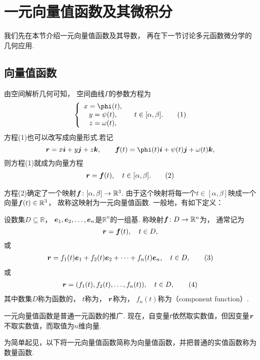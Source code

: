 \section{一元向量值函数及其微积分}
我们先在本节介绍一元向量值函数及其导数，
再在下一节讨论多元函数微分学的几何应用.

\subsection{向量值函数}
由空间解析几何可知，
空间曲线\(\Gamma\)的参数方程为\begin{gather}
	\left\{ \begin{array}{c}
		x=\phi(t), \\
		y=\psi(t), \\
		z=\omega(t),
	\end{array} \right. \quad
	t \in [\alpha,\beta].
	\tag1
\end{gather}
方程(1)也可以改写成向量形式.若记\[
	\vb{r}=x\vb{i}+y\vb{j}+z\vb{k},
	\qquad
	\vb{f}(t)=\phi(t)\vb{i}+\psi(t)\vb{j}+\omega(t)\vb{k},
\]
则方程(1)就成为向量方程\begin{gather}
	\vb{r}=\vb{f}(t), \quad t \in [\alpha,\beta].
	\tag2
\end{gather}

方程(2)确定了一个映射\(\boldsymbol{f}\colon [\alpha,\beta]\to\mathbb{R}^3\).
由于这个映射将每一个\(t\in[\alpha,\beta]\)映成一个向量\(\boldsymbol{f}(t)\in\mathbb{R}^3\)，
故称这映射为一元向量值函数.
一般地，有如下定义：
\begin{definition}
设数集\(D \subseteq \mathbb{R}\)，
\(\boldsymbol{e}_1,\boldsymbol{e}_2,\dotsc,\boldsymbol{e}_n\)是\(\mathbb{R}^n\)的一组基.
称映射\(\boldsymbol{f}\colon D\to\mathbb{R}^n\)为，
通常记为\[
	\boldsymbol{r}=\boldsymbol{f}(t), \quad t \in D,
\]
或\begin{gather}
	\vb{r}=f_1(t)\vb{e}_1+f_2(t)\vb{e}_2+\dotsb+f_n(t)\vb{e}_n, \quad t \in D,
	\tag3
\end{gather}
或\begin{gather}
	\vb{r}=(f_1(t),f_2(t),\dotsc,f_n(t)), \quad t \in D,
	\tag4
\end{gather}
其中数集\(D\)称为函数的，
\(t\)称为，
\(\boldsymbol{r}\)称为，
\(f_n(t)\)称为（component function）.
\end{definition}
一元向量值函数是普通一元函数的推广.
现在，自变量\(t\)依然取实数值，但因变量\(\boldsymbol{r}\)不取实数值，而取值为\(n\)维向量.

为简单起见，以下将一元向量值函数简称为向量值函数，并把普通的实值函数称为数量函数.


